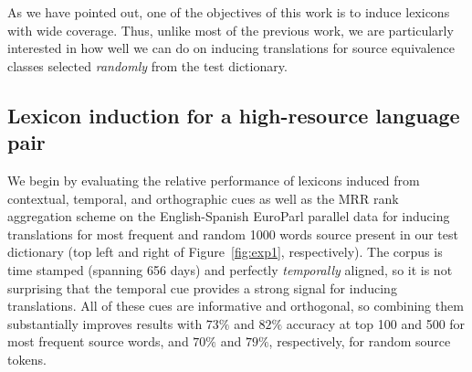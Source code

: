 \documentclass{article}
\newcommand{\figref}[1]{Figure~\ref{#1}}
\begin{document}
As we have pointed out, one of the objectives of this work is to induce lexicons with wide coverage.  Thus, unlike most of the previous work, we are particularly interested in how well we can do on inducing translations for source equivalence classes selected \emph{randomly} from the test dictionary.

\subsection{Lexicon induction for a high-resource language pair} \label{sect:exphigh}

We begin by evaluating the relative performance of lexicons induced from contextual, temporal, and orthographic cues as well as the MRR rank aggregation scheme on the English-Spanish EuroParl parallel data for inducing translations for most frequent and random 1000 words source present in our test dictionary (top left and right of \figref{fig:exp1}, respectively). The corpus is time stamped (spanning 656 days) and perfectly \emph{temporally} aligned, so it is not surprising that the temporal cue provides a strong signal for inducing translations.  All of these cues are informative and orthogonal, so combining them substantially improves results with $73\%$ and  $82\%$ accuracy at top 100 and 500 for most frequent source words, and $70\%$ and  $79\%$, respectively, for random source tokens.  \\
\end{document}
